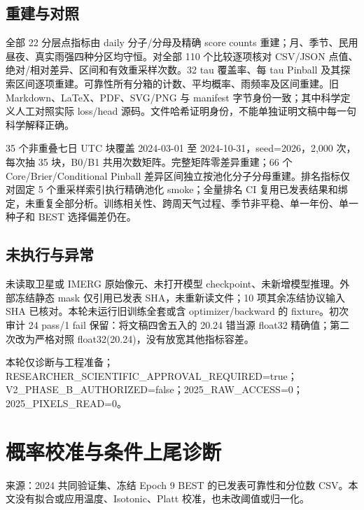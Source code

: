 \documentclass[UTF8,a4paper,10pt,fontset=fandol]{ctexart}
\begin{document}
\subsection*{重建与对照}

全部 22 分层点指标由 daily 分子/分母及精确 score counts 重建；月、季节、民用昼夜、真实雨强四种分区均守恒。对全部 110 个比较逐项核对 CSV/JSON 点值、绝对/相对差异、区间和有效重采样次数。32 tau 覆盖率、每 tau Pinball 及其探索区间逐项重建。可靠性所有分箱的计数、平均概率、雨频率及区间重建。旧 Markdown、LaTeX、PDF、SVG/PNG 与 manifest 字节身份一致；其中科学定义人工对照实际 loss/head 源码。文件哈希证明身份，不能单独证明文稿中每一句科学解释正确。\par

35 个非重叠七日 UTC 块覆盖 2024-03-01 至 2024-10-31，seed=2026，2,000 次，每次抽 35 块，B0/B1 共用次数矩阵。完整矩阵零差异重建；66 个 Core/Brier/Conditional Pinball 差异区间独立按池化分子分母重建。排名指标仅对固定 5 个重采样索引执行精确池化 smoke；全量排名 CI 复用已发表结果和绑定，未重复全部分析。训练相关性、跨周天气过程、季节非平稳、单一年份、单一种子和 BEST 选择偏差仍在。\par

\subsection*{未执行与异常}

未读取卫星或 IMERG 原始像元、未打开模型 checkpoint、未新增模型推理。外部冻结静态 mask 仅引用已发表 SHA，未重新读文件；10 项其余冻结协议输入 SHA 已核对。本轮未运行旧训练全套或含 optimizer/backward 的 fixture。初次审计 24 pass/1 fail 保留：将文稿四舍五入的 20.24 错当源 float32 精确值；第二次改为严格对照 float32(20.24)，没有放宽其他指标容差。\par

本轮仅诊断与工程准备；RESEARCHER\_\allowbreak{}SCIENTIFIC\_\allowbreak{}APPROVAL\_\allowbreak{}REQUIRED=true；V2\_\allowbreak{}PHASE\_\allowbreak{}B\_\allowbreak{}AUTHORIZED=false；2025\_\allowbreak{}RAW\_\allowbreak{}ACCESS=0；2025\_\allowbreak{}PIXELS\_\allowbreak{}READ=0。\par

\clearpage
\section*{概率校准与条件上尾诊断}

来源：2024 共同验证集、冻结 Epoch 9 BEST 的已发表可靠性和分位数 CSV。本文没有拟合或应用温度、Isotonic、Platt 校准，也未改阈值或归一化。\par
\end{document}
